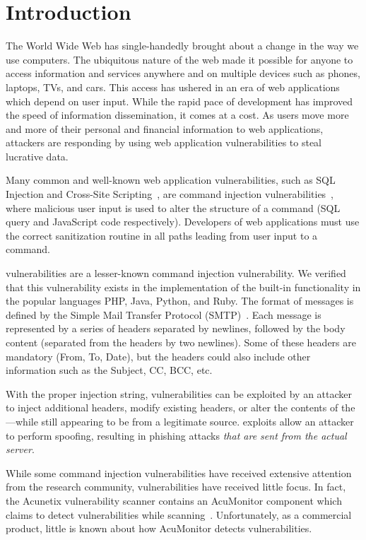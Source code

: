 \section{Introduction}
The World Wide Web has single-handedly brought about a change in the way we use computers. The ubiquitous nature of the web made it possible for anyone to access information and services anywhere and on multiple devices such as phones, laptops, TVs, and cars. This access has ushered in an era of web applications which depend on user input. 
While the rapid pace of development has improved the speed of
information dissemination, it comes at a cost. As users move more and
more of their personal and financial information to web applications,
attackers are responding by using web application vulnerabilities to steal lucrative data.

Many common and well-known web application vulnerabilities, such as SQL Injection and Cross-Site Scripting~\cite{OWASPT10}, are command injection vulnerabilities~\cite{commandinjection}, where malicious user input is used to alter the structure of a command (SQL query and JavaScript code respectively). Developers of web applications must use the correct sanitization routine in all paths leading from user input to a command. 

\ehi vulnerabilities are a lesser-known command injection vulnerability. We verified that this vulnerability exists in the implementation of the built-in \email functionality in the popular languages PHP, Java, Python, and Ruby. The format of \email messages is defined by the Simple Mail Transfer Protocol (SMTP)~\cite{rfc5322}. Each \email message is represented by a series of headers separated by newlines, followed by the body content (separated from the headers by two newlines). Some of these headers are mandatory (From, To, Date), but the headers could also include other information such as the Subject, CC, BCC, etc.

With the proper injection string, \ehi vulnerabilities can be exploited by an attacker to inject additional headers, modify existing headers, or alter the contents of the \email---while still appearing to be from a legitimate source. \ehi exploits allow an attacker to perform \email spoofing, resulting in phishing attacks \emph{that are sent from the actual \email server}.

While some command injection vulnerabilities have received extensive attention from the research community, \ehi vulnerabilities have received little focus. In fact, the Acunetix vulnerability scanner contains an AcuMonitor component which claims to detect \ehi vulnerabilities while scanning~\cite{acumonitor}. Unfortunately, as a commercial product, little is known about how AcuMonitor detects \ehi vulnerabilities. 

